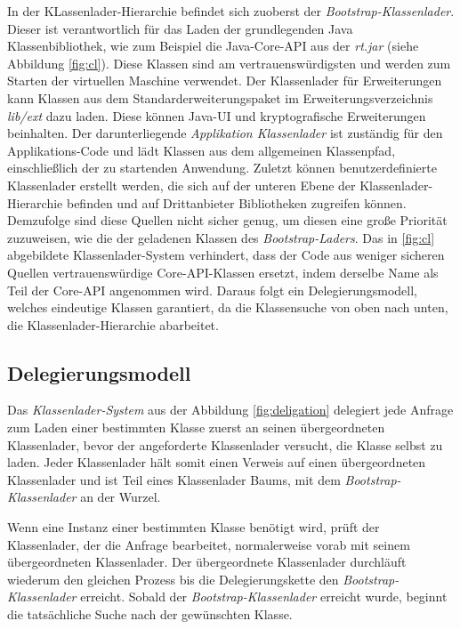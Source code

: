     In der KLassenlader-Hierarchie befindet sich zuoberst der \textit{Bootstrap-Klassenlader}. Dieser ist verantwortlich für das Laden der grundlegenden Java Klassenbibliothek, wie zum Beispiel die Java-Core-API aus der \textit{rt.jar} (siehe Abbildung \ref{fig:cl}). Diese Klassen sind am vertrauenswürdigsten und werden zum Starten der virtuellen Maschine verwendet. Der Klassenlader für Erweiterungen kann Klassen  aus dem Standarderweiterungspaket im Erweiterungsverzeichnis \textit{lib/ext} dazu laden. Diese können Java-UI und kryptografische Erweiterungen beinhalten. Der darunterliegende \textit{Applikation Klassenlader} ist zuständig für den Applikations-Code und lädt Klassen aus dem allgemeinen Klassenpfad, einschließlich der zu startenden Anwendung. Zuletzt können benutzerdefinierte Klassenlader erstellt werden, die sich auf der unteren Ebene der Klassenlader-Hierarchie befinden und auf Drittanbieter Bibliotheken zugreifen können. Demzufolge sind diese Quellen nicht sicher genug, um diesen eine große Priorität zuzuweisen, wie die der geladenen Klassen des \textit{Bootstrap-Laders}. \bigbreak 
    Das in \ref{fig:cl} abgebildete Klassenlader-System verhindert, dass der Code aus weniger sicheren Quellen vertrauenswürdige Core-API-Klassen ersetzt, indem derselbe Name als Teil der Core-API angenommen wird. Daraus folgt ein Delegierungsmodell, welches eindeutige Klassen garantiert, da die Klassensuche von oben nach unten, die Klassenlader-Hierarchie abarbeitet. \cite{classLoadingIntro} 
    

  \subsection{Delegierungsmodell} \label{sec:dm}
    
    Das \textit{Klassenlader-System} aus der Abbildung \ref{fig:deligation} delegiert jede Anfrage zum Laden einer bestimmten Klasse zuerst an seinen übergeordneten Klassenlader, bevor der angeforderte Klassenlader versucht, die Klasse selbst zu laden. Jeder Klassenlader hält somit einen Verweis auf einen übergeordneten Klassenlader und ist Teil eines Klassenlader Baums, mit dem \textit{Bootstrap-Klassenlader} an der Wurzel. 

    Wenn eine Instanz einer bestimmten Klasse benötigt wird, prüft der Klassenlader, der die Anfrage bearbeitet, normalerweise vorab mit seinem übergeordneten Klassenlader. Der übergeordnete Klassenlader durchläuft wiederum den gleichen Prozess bis die Delegierungskette den \textit{Bootstrap-Klassenlader} erreicht. Sobald der \textit{Bootstrap-Klassenlader} erreicht wurde, beginnt die tatsächliche Suche nach der gewünschten Klasse.

